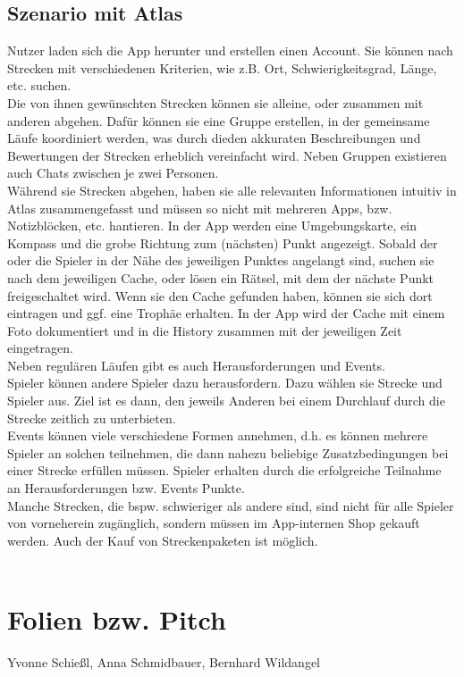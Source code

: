 \documentclass[a4paper, 12pt]{article}
\begin{document}
\subsection{Szenario mit Atlas}
Nutzer laden sich die App herunter und erstellen einen Account.
Sie können nach Strecken mit verschiedenen Kriterien, wie z.B. Ort, Schwierigkeitsgrad, Länge, etc. suchen. \\
Die von ihnen gewünschten Strecken können sie alleine, oder zusammen mit anderen abgehen. Dafür können sie eine Gruppe erstellen, in der gemeinsame Läufe koordiniert werden, was durch dieden akkuraten Beschreibungen und Bewertungen der Strecken erheblich vereinfacht wird. Neben Gruppen existieren auch Chats zwischen je zwei Personen.\\
Während sie Strecken abgehen, haben sie alle relevanten Informationen intuitiv in Atlas zusammengefasst und müssen so nicht mit mehreren Apps, bzw. Notizblöcken, etc. hantieren. In der App werden eine Umgebungskarte, ein Kompass und die grobe Richtung zum (nächsten) Punkt angezeigt. Sobald der oder die Spieler in der Nähe des jeweiligen Punktes angelangt sind, suchen sie nach dem jeweiligen Cache, oder lösen ein Rätsel, mit dem der nächste Punkt freigeschaltet wird. Wenn sie den Cache gefunden haben, können sie sich dort eintragen und ggf. eine Trophäe erhalten. In der App wird der Cache mit einem Foto dokumentiert und in die History zusammen mit der jeweiligen Zeit eingetragen.\\
Neben regulären Läufen gibt es auch Herausforderungen und Events.\\
Spieler können andere Spieler dazu herausfordern. Dazu wählen sie Strecke und Spieler aus. Ziel ist es dann, den jeweils Anderen bei einem Durchlauf durch die Strecke zeitlich zu unterbieten.\\
Events können viele verschiedene Formen annehmen, d.h. es können mehrere Spieler an solchen teilnehmen, die dann nahezu beliebige Zusatzbedingungen bei einer Strecke erfüllen müssen. Spieler erhalten durch die erfolgreiche Teilnahme an Herausforderungen bzw. Events Punkte.\\
Manche Strecken, die bspw. schwieriger als andere sind, sind nicht für alle Spieler von vorneherein zugänglich, sondern müssen im App-internen Shop gekauft werden. Auch der Kauf von Streckenpaketen ist möglich.\\
\\

\newpage
\section{Folien bzw. Pitch}Yvonne Schießl, Anna Schmidbauer, Bernhard Wildangel\\
\end{document}
